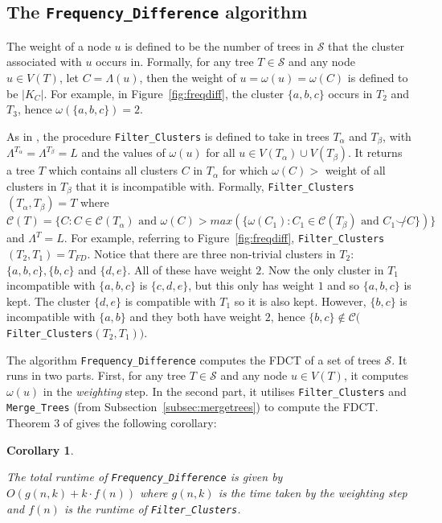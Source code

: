 \documentclass{article}
\newcommand{\compatible}{\smile}
\newcommand{\leafset}{\Lambda}
\newcommand{\weight}{\omega}
\newcommand{\TA}{T_\alpha}
\newcommand{\TB}{T_\beta}
\newtheorem{freqdiffruntimecomponents}[incompatibility]{Corollary}
\begin{document}
    \subsection{The \texttt{Frequency\_Difference} algorithm}

    The weight of a node $u$ is defined to be the number of trees in $\mathcal{S}$ that the cluster associated with $u$ occurs in. Formally, for any tree $T \in \mathcal{S}$ and any node $u \in V(T)$, let $C = \leafset(u)$, then the weight of $u = \weight(u) = \weight(C)$ is defined to be $|K_C|$. For example, in Figure~\ref{fig:freqdiff}, the cluster $\{a, b, c\}$ occurs in $T_2$ and $T_3$, hence $\weight(\{a, b, c\}) = 2$.

    As in \cite{jansson2018algorithms}, the procedure \texttt{Filter\_Clusters} is defined to take in trees $\TA$ and $\TB$, with $\leafset^{\TA} = \leafset^{\TB} = L$ and the values of $\weight(u)$ for all $u \in V(\TA) \cup V(\TB)$. It returns a tree $T$ which contains all clusters $C$ in $\TA$ for which $\weight(C) > $ weight of all clusters in $\TB$ that it is incompatible with. Formally, \texttt{Filter\_Clusters}$(\TA, \TB) = T$ where $\mathcal{C}(T) = \{C : C \in \mathcal{C}(\TA) \text{ and } \weight(C) > max(\{\weight(C_1) : C_1 \in \mathcal{C}(\TB) \text{ and } C_1 \not\compatible C\})\}$ and $\leafset^T = L$. For example, referring to Figure~\ref{fig:freqdiff}, \texttt{Filter\_Clusters}$(T_2, T_1) = T_{FD}$. Notice that there are three non-trivial clusters in $T_2$: $\{a, b, c\}, \{b, c\}$ and $\{d, e\}$. All of these have weight $2$. Now the only cluster in $T_1$ incompatible with $\{a, b, c\}$ is $\{c, d, e\}$, but this only has weight $1$ and so $\{a, b, c\}$ is kept. The cluster $\{d, e\}$ is compatible with $T_1$ so it is also kept. However, $\{b, c\}$ is incompatible with $\{a, b\}$ and they both have weight $2$, hence $\{b, c\} \not\in \mathcal{C}($\texttt{Filter\_Clusters}$(T_2, T_1))$.

    The algorithm \texttt{Frequency\_Difference} \cite{jansson2018algorithms} computes the FDCT of a set of trees $\mathcal{S}$. It runs in two parts. First, for any tree $T \in \mathcal{S}$ and any node $u \in V(T)$, it computes $\weight(u)$ in the \textit{weighting} step. In the second part, it utilises \texttt{Filter\_Clusters} and \texttt{Merge\_Trees} (from Subsection~\ref{subsec:mergetrees}) to compute the FDCT. Theorem 3 of \cite{jansson2018algorithms} gives the following corollary:
    \newline

    \begin{freqdiffruntimecomponents}
        \label{cor:freqdiffruntimecomponents}

        The total runtime of \texttt{Frequency\_Difference} is given by $O(g(n, k) + k \cdot f(n))$ where $g(n, k)$ is the time taken by the weighting step and $f(n)$ is the runtime of \texttt{Filter\_Clusters}.
    \end{freqdiffruntimecomponents}
\end{document}
